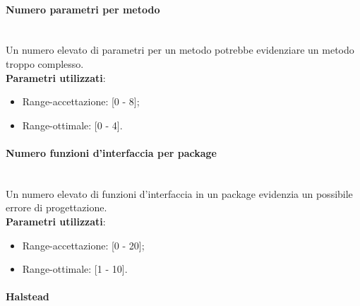 			
			\paragraph{Numero parametri per metodo}\mbox{} \\
				
			Un numero elevato di parametri per un metodo potrebbe evidenziare un metodo troppo complesso.\\
			\textbf{Parametri utilizzati}:
			\begin{itemize}
				\item Range-accettazione: [0 - 8];
				\item Range-ottimale: [0 - 4].
			\end{itemize}
			
			
			\paragraph{Numero funzioni d'interfaccia per package}\mbox{} \\
				
			Un numero elevato di funzioni d'interfaccia in un package evidenzia un possibile errore di progettazione.\\
			\textbf{Parametri utilizzati}:
			\begin{itemize}
				\item Range-accettazione: [0 - 20];
				\item Range-ottimale: [1 - 10].
			\end{itemize}

			
			\paragraph{Halstead}\mbox{} \\
			
